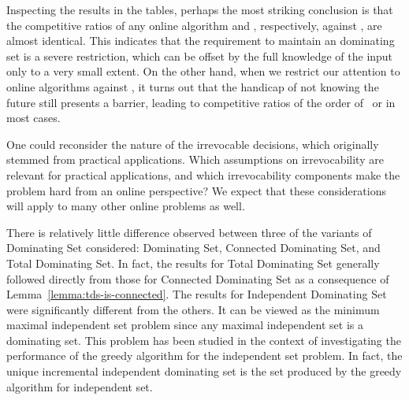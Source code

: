 Inspecting the results in the tables, perhaps the most striking conclusion
is that the competitive ratios of any online algorithm and \onopt,
respectively, against \offopt, are almost identical.
This indicates that the requirement to
maintain an \incr dominating set is a severe restriction, which can be 
offset by the full knowledge of the input only to a very small extent. 
On the other hand, when we restrict our attention to online algorithms
against \onopt,
it turns out that the handicap of not knowing the future still presents 
a barrier,
leading to competitive ratios of the order of~ or 
in most cases.

One could reconsider the nature of the irrevocable decisions, 
which originally stemmed from practical applications.
Which assumptions on irrevocability are relevant for practical 
applications, and which irrevocability components make the problem hard
from an online perspective?
We expect that these considerations will apply to many other online problems as well.

There is relatively little difference observed between three of the variants
of Dominating Set considered: Dominating Set, Connected Dominating
Set, and Total Dominating Set. In fact, the results for Total
Dominating Set generally followed directly from those for
Connected Dominating Set as a consequence of Lemma~\ref{lemma:tds-is-connected}.
The results for Independent Dominating Set were significantly different from
the others. It can be viewed as the minimum maximal
independent set problem since any maximal independent set is a
dominating set. This problem has been studied in the context of
investigating the performance of the greedy algorithm for the
independent set problem.
In fact, the unique incremental independent dominating set is the
set produced by the greedy algorithm for independent set.


